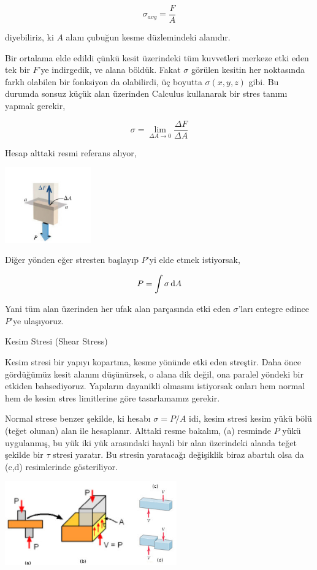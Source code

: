 \documentclass[12pt,fleqn]{article}\usepackage{../../common}
\begin{document}
$$
\sigma_{avg} = \frac{F}{A}
$$

diyebiliriz, ki $A$ alanı çubuğun kesme düzlemindeki alanıdır.

Bir ortalama elde edildi çünkü kesit üzerindeki tüm kuvvetleri merkeze etki eden
tek bir $F$'ye indirgedik, ve alana böldük. Fakat $\sigma$ görülen kesitin her
noktasında farklı olabilen bir fonksiyon da olabilirdi, üç boyutta
$\sigma(x,y,z)$ gibi. Bu durumda sonsuz küçük alan üzerinden Calculus kullanarak
bir stres tanımı yapmak gerekir,

$$
\sigma = \lim_{\Delta A \to 0} \frac{\Delta F}{\Delta A}
$$

Hesap alttaki resmi referans alıyor,

\includegraphics[width=10em]{phy_020_strs_01_02.jpg}

Diğer yönden eğer stresten başlayıp $P$'yi elde etmek istiyorsak,

$$
P = \int \sigma \,\mathrm{d} A
$$

Yani tüm alan üzerinden her ufak alan parçasında etki eden $\sigma$'ları
entegre edince $P$'ye ulaşıyoruz.

Kesim Stresi (Shear Stress)

Kesim stresi bir yapıyı kopartma, kesme yönünde etki eden streştir. Daha
önce gördüğümüz kesit alanını düşünürsek, o alana dik değil, ona paralel
yöndeki bir etkiden bahsediyoruz. Yapıların dayanikli olmasını istiyorsak
onları hem normal hem de kesim stres limitlerine göre tasarlamamız gerekir.

Normal strese benzer şekilde, ki hesabı $\sigma = P/A$ idi, kesim stresi kesim
yükü bölü (teğet olunan) alan ile hesaplanır. Alttaki resme bakalım, (a)
resminde $P$ yükü uygulanmış, bu yük iki yük arasındaki hayali bir alan
üzerindeki alanda teğet şekilde bir $\tau$ stresi yaratır. Bu stresin yaratacağı
değişiklik biraz abartılı olsa da (c,d) resimlerinde gösteriliyor.

\includegraphics[width=20em]{phy_020_strs_01_03.jpg}
\end{document}
